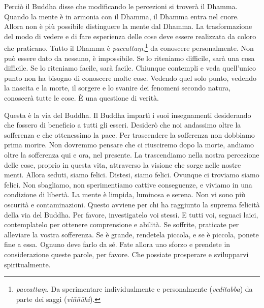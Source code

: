 Perciò il Buddha disse che modificando le percezioni si troverà il
Dhamma. Quando la mente è in armonia con il Dhamma, il Dhamma entra nel
cuore. Allora non è più possibile distinguere la mente dal Dhamma. La
trasformazione del modo di vedere e di fare esperienza delle cose deve
essere realizzata da coloro che praticano. Tutto il Dhamma è
\emph{paccattaṃ},\footnote{\emph{paccattaṃ}. Da sperimentare
  individualmente e personalmente (\emph{veditabba}) da parte dei saggi
  (\emph{viññūhi}).} da conoscere personalmente. Non può essere dato da
nessuno, è impossibile. Se lo riteniamo difficile, sarà una cosa
difficile. Se lo riteniamo facile, sarà facile. Chiunque contempli e
veda quell'unico punto non ha bisogno di conoscere molte cose. Vedendo
quel solo punto, vedendo la nascita e la morte, il sorgere e lo svanire
dei fenomeni secondo natura, conoscerà tutte le cose. È una questione di
verità.

Questa è la via del Buddha. Il Buddha impartì i suoi insegnamenti
desiderando che fossero di beneficio a tutti gli esseri. Desiderò che
noi andassimo oltre la sofferenza e che ottenessimo la pace. Per
trascendere la sofferenza non dobbiamo prima morire. Non dovremmo
pensare che ci riusciremo dopo la morte, andiamo oltre la sofferenza qui
e ora, nel presente. La trascendiamo nella nostra percezione delle cose,
proprio in questa vita, attraverso la visione che sorge nelle nostre
menti. Allora seduti, siamo felici. Distesi, siamo felici. Ovunque ci
troviamo siamo felici. Non sbagliamo, non sperimentiamo cattive
conseguenze, e viviamo in una condizione di libertà. La mente è limpida,
luminosa e serena. Non vi sono più oscurità e contaminazioni. Questo
avviene per chi ha raggiunto la suprema felicità della via del Buddha.
Per favore, investigatelo voi stessi. E tutti voi, seguaci laici,
contemplatelo per ottenere comprensione e abilità. Se soffrite,
praticate per alleviare la vostra sofferenza. Se è grande, rendetela
piccola, e se è piccola, ponete fine a essa. Ognuno deve farlo da sé.
Fate allora uno sforzo e prendete in considerazione queste parole, per
favore. Che possiate prosperare e svilupparvi spiritualmente.

